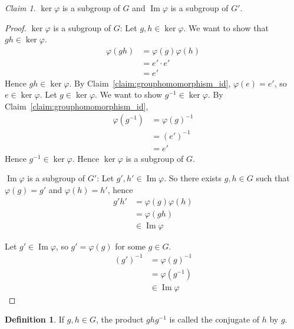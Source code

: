 \documentclass[12pt,letterpaper,DIV=11,final]{scrartcl}
\theoremstyle{plain}
\theoremstyle{definition}
\newtheorem{definition}{Definition}[section]
\theoremstyle{remark}
\newtheorem{claim}{Claim}
\DeclareMathOperator{\ima}{Im}
\begin{document}
\begin{claim}
  $\ker \varphi$ is a subgroup of $G$ and $\ima \varphi$ is a subgroup of $G'$.

  \begin{proof}
    $\ker \varphi$ is a subgroup of $G$:
    Let $g, h \in \ker \varphi$.
    We want to show that $gh \in \ker \varphi$.
    \begin{align*}
      \varphi(gh) &= \varphi(g) \varphi(h) \\
                  &= e' \cdot e' \\
                  &= e'
    \end{align*}
    Hence $gh \in \ker \varphi$.
    By Claim~\ref{claim:grouphomomorphism_id}, $\varphi(e) = e'$, so $e \in \ker \varphi$.
    Let $g \in \ker \varphi$.
    We want to show $g^{-1} \in \ker \varphi$.
    By Claim~\ref{claim:grouphomomorphism_id},
    \begin{align*}
      \varphi(g^{-1}) &= {\varphi(g)}^{-1} \\
                      &= {(e')}^{-1} \\
                      &= e'
    \end{align*}
    Hence $g^{-1} \in \ker \varphi$.
    Hence $\ker \varphi$ is a subgroup of $G$.

    $\ima \varphi$ is a subgroup of $G'$:
    Let $g', h' \in \ima \varphi$.
    So there exists $g, h \in G$ such that $\varphi(g) = g'$ and $\varphi(h) = h'$, hence
    \begin{align*}
      g' h' &= \varphi(g) \varphi(h) \\
            &= \varphi(gh) \\
            &\in \ima \varphi
    \end{align*}

    Let $g' \in \ima \varphi$, so $g' = \varphi(g)$ for some $g \in G$.
    \begin{align*}
      {(g')}^{-1} &= {\varphi(g)}^{-1} \\
                  &= \varphi(g^{-1}) \\
                  &\in \ima \varphi
    \end{align*}

  \end{proof}
\end{claim}

\begin{definition}\label{def:conjugate}
  If $g, h \in G$, the product $g h g^{-1}$ is called the conjugate of $h$ by $g$.
\end{definition}
\end{document}
